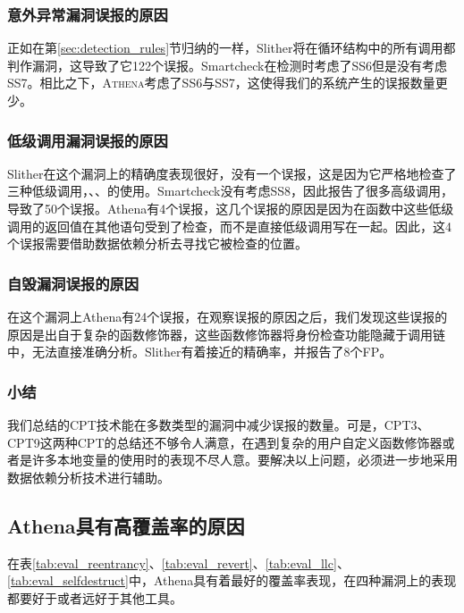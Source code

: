 \subsubsection{意外异常漏洞误报的原因}

正如在第\ref{sec:detection_rules}节归纳的一样，Slither将在循环结构中的所有调用都判作漏洞，这导致了它122个误报。Smartcheck在检测时考虑了SS6但是没有考虑SS7。相比之下，\textsc{Athena}考虑了SS6与SS7，这使得我们的系统产生的误报数量更少。

\subsubsection{低级调用漏洞误报的原因}

Slither在这个漏洞上的精确度表现很好，没有一个误报，这是因为它严格地检查了三种低级调用，、、的使用。Smartcheck没有考虑SS8，因此报告了很多高级调用，导致了50个误报。Athena有4个误报，这几个误报的原因是因为在函数中这些低级调用的返回值在其他语句受到了检查，而不是直接低级调用写在一起。因此，这4个误报需要借助数据依赖分析去寻找它被检查的位置。

\subsubsection{自毁漏洞误报的原因}

在这个漏洞上Athena有24个误报，在观察误报的原因之后，我们发现这些误报的原因是出自于复杂的函数修饰器，这些函数修饰器将身份检查功能隐藏于调用链中，无法直接准确分析。Slither有着接近的精确率，并报告了8个FP。

\subsubsection{小结}

我们总结的CPT技术能在多数类型的漏洞中减少误报的数量。可是，CPT3、CPT9这两种CPT的总结还不够令人满意，在遇到复杂的用户自定义函数修饰器或者是许多本地变量的使用时的表现不尽人意。要解决以上问题，必须进一步地采用数据依赖分析技术进行辅助。

\subsection{Athena具有高覆盖率的原因}

在表\ref{tab:eval_reentrancy}、\ref{tab:eval_revert}、\ref{tab:eval_llc}、\ref{tab:eval_selfdestruct}中，Athena具有着最好的覆盖率表现，在四种漏洞上的表现都要好于或者远好于其他工具。

